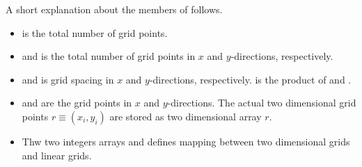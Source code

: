 A short explanation about the members of  follows.
%
\begin{itemize}
%
\item {} is the total number of grid points.
%
\item {} and  is the total number of grid points
in $x$ and $y$-directions, respectively.
%
\item {} and  is grid spacing in $x$ and $y$-directions,
respectively.  is the product of  and .
%
\item {} and  are the grid points in $x$ and $y$-directions.
The actual two dimensional grid points $r \equiv (x_{i},y_{i})$ are stored as
two dimensional array $r$.
%
\item Thw two integers arrays  and  defines
mapping between two dimensional grids and linear grids.
\end{itemize}


